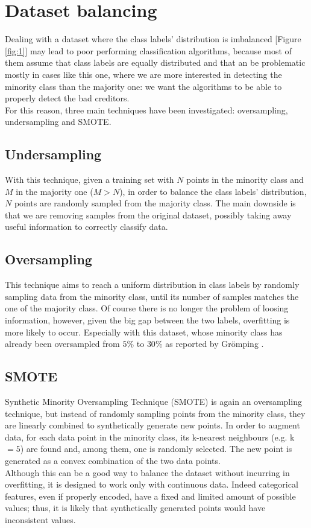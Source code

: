 \documentclass[letterpaper]{article}
\begin{document}
	\section{Dataset balancing} \label{dataset_balancing}
	Dealing with a dataset where the class labels' distribution is imbalanced [Figure \ref{fig:1}] may lead to poor performing classification algorithms, because most of them assume that class labels are equally distributed and that an be problematic mostly in cases like this one, where we are more interested in detecting the minority class than the majority one: we want the algorithms to be able to properly detect the bad creditors.\\
	For this reason, three main techniques have been investigated: oversampling, undersampling and SMOTE.
	\subsection{Undersampling}
	With this technique, given a training set with $N$ points in the minority class and $M$ in the majority one ($M > N$), in order to balance the class labels' distribution, $N$ points are randomly sampled from the majority class. The main downside is that we are removing samples from the original dataset, possibly taking away useful information to correctly classify data.
	\subsection{Oversampling}
	This technique aims to reach a uniform distribution in class labels by randomly sampling data from the minority class, until its number of samples matches the one of the majority class. Of course there is no longer the problem of loosing information, however, given the big gap between the two labels, overfitting is more likely to occur. Especially with this dataset, whose minority class has already been oversampled from $5\%$ to $30\%$ as reported by Grömping \cite{gromping}.
	\subsection{SMOTE}
	Synthetic Minority Oversampling Technique (SMOTE) is again an oversampling technique, but instead of randomly sampling points from the minority class, they are linearly combined to synthetically generate new points. In order to augment data, for each data point in the minority class, its k-nearest neighbours (e.g. k$=5$) are found and, among them, one is randomly selected. The new point is generated as a convex combination of the two data points. \\
	Although this can be a good way to balance the dataset without incurring in overfitting, it is designed to work only with continuous data. Indeed categorical features, even if properly encoded, have a fixed and limited amount of possible values; thus, it is likely that synthetically generated points would have inconsistent values. 
	
\end{document}
